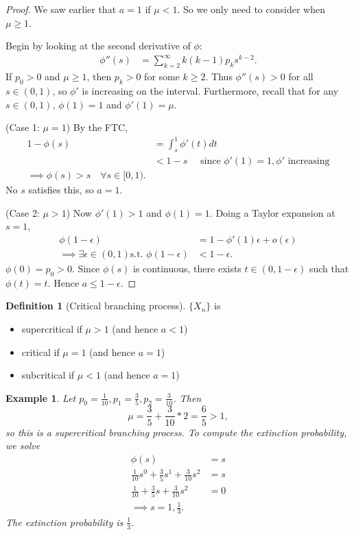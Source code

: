 \documentclass{tufte-handout}
\newtheorem{ex}[thm]{Example}
\theoremstyle{definition}
\newtheorem{defn}[thm]{Definition}
\begin{document}
\begin{proof}
	We saw earlier that $a=1$ if $\mu < 1$. So we only need to consider when $\mu \ge 1$.

	Begin by looking at the second derivative of $\phi$:
	\begin{align*}
		\phi''(s) &= \sum\limits_{k=2}^{\infty} k(k-1)p_k s^{k-2}
	.\end{align*}
	If $p_0 > 0$ and $\mu \ge 1$, then $p_k > 0$ for some $k \ge 2$. Thus $\phi''(s) > 0$ for all $s \in (0,1)$, so $\phi'$ is increasing on the interval. Furthermore, recall that for any $s \in (0,1)$, $\phi(1) = 1$ and $\phi'(1) = \mu$. 

	(Case 1: $\mu =1$) By the FTC, 
	\begin{align*}
		1- \phi(s) &= \int_{s}^{1} \phi'(t)dt \\
		&< 1-s \quad \text{ since } \phi'(1) = 1, \phi' \text{ increasing} \\
		\implies \phi(s) > s \quad \forall  s \in [0,1)
	.\end{align*}
	No $s$ satisfies this, so $a=1$.

	(Case 2: $\mu > 1$) Now $\phi'(1) > 1$ and $\phi(1) = 1$. Doing a Taylor expansion at $s = 1$, 
	\begin{align*}
		\phi(1-\epsilon) &= 1 -\phi'(1)\epsilon + o(\epsilon) \\
		\implies \exists \epsilon \in (0,1) \text{s.t. } \phi(1-\epsilon) &< 1- \epsilon
	.\end{align*}
	$\phi(0) = p_0 > 0$. Since $\phi(s)$ is continuous, there exists $t \in (0,1-\epsilon)$ such that $\phi(t) = t$. Hence $a \le 1- \epsilon$.
\end{proof}

\begin{defn}[Critical branching process]
	$\{X_n\}$ is
	\begin{itemize}
		\item supercritical if $\mu > 1$ (and hence $a < 1$)
		\item critical if $\mu = 1$ (and hence $a=1$)
		\item subcritical if $\mu < 1$ (and hence $a=1$)
	\end{itemize}
\end{defn}

\begin{ex}
	Let $p_0 = \frac{1}{10}, p_1 = \frac{3}{5}, p_2 = \frac{3}{10}$. Then \[
		\mu = \frac{3}{5} + \frac{3}{10} * 2 = \frac{6}{5} > 1
	,\] so this is a supercritical branching process.
	To compute the extinction probability, we solve
	\begin{align*}
		\phi(s) &= s \\
		\frac{1}{10}s^{0} + \frac{3}{5} s^{1} + \frac{3}{10}s^{2} &=  s \\
		\frac{1}{10} + \frac{3}{5}s + \frac{3}{10}s^2 &= 0 \\
		\implies s = 1, \frac{1}{3}
	.\end{align*}
	The extinction probability is $\frac{1}{3}$.
\end{ex}
\end{document}
